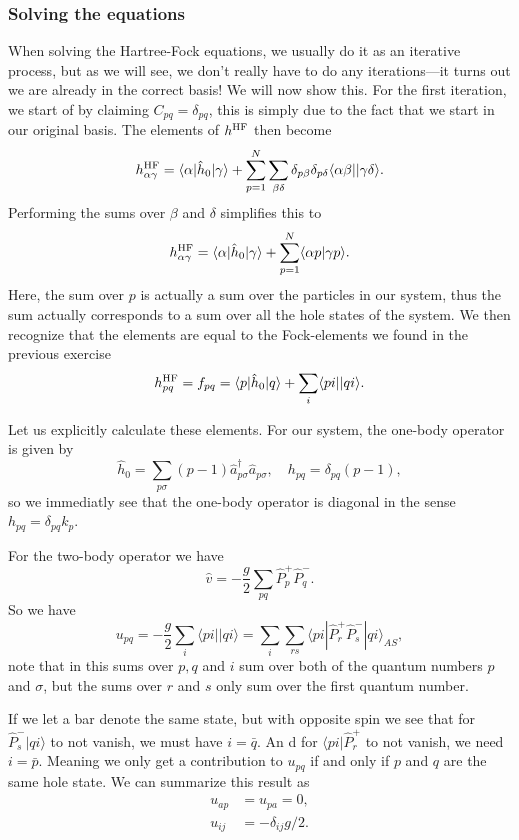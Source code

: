 \documentclass[a4paper, 11pt, notitlepage, english]{article}
\newcommand{\bra}[1]{\langle #1|}
\newcommand{\ket}[1]{|#1 \rangle}
\newcommand{\braket}[2]{\langle #1 | #2 \rangle}
\newcommand{\brakket}[2]{\langle #1 || #2 \rangle}
\newcommand{\op}[1]{\hat{#1}}
\newcommand{\braopket}[3]{\langle #1 | {#2} | #3 \rangle}
\begin{document}
\subsubsection*{Solving the equations}

When solving the Hartree-Fock equations, we usually do it as an iterative process, but as we will see, we don't really have to do any iterations---it turns out we are already in the correct basis! We will now show this. For the first iteration, we start of by claiming $C_{pq} = \delta_{pq}$, this is simply due to the fact that we start in our original basis. 
The elements of $h^{\rm HF}$ then become
$$h^{\rm HF}_{\alpha\gamma} = \braopket{\alpha}{\op{h}_0}{\gamma} + \sum_{p=1}^N\sum_{\beta\delta} \delta_{p\beta} \delta_{p \delta} \braket{\alpha\beta|}{\gamma\delta}.$$
Performing the sums over $\beta$ and $\delta$ simplifies this to
$$h^{\rm HF}_{\alpha\gamma} = \braopket{\alpha}{\op{h}_0}{\gamma} + \sum_{p=1}^N \braket{\alpha p}{\gamma p}.$$
Here, the sum over $p$ is actually a sum over the particles in our system, thus the sum actually corresponds to a sum over all the hole states of the system. We then recognize that the elements are equal to the Fock-elements we found in the previous exercise
$$h^{\rm HF}_{pq} = f_{pq} = \braopket{p}{\op{h}_0}{q} + \sum_{i} \brakket{pi}{qi}.$$

Let us explicitly calculate these elements. For our system, the one-body operator is given by
$$\op{h}_0 = \sum_{p\sigma} (p-1)\op{a}_{p\sigma}^\dagger \op{a}_{p\sigma}, \quad h_{pq} = \delta_{pq} (p-1),$$
so we immediatly see that the one-body operator is diagonal in the sense $h_{pq} = \delta_{pq} k_p$.

For the two-body operator we have 
$$\op{v} = -\frac{g}{2}\sum_{pq}\op{P}_{p}^+ \op{P}_{q}^-.$$
So we have
$$u_{pq} = -\frac{g}{2} \sum_{i} \brakket{pi}{qi} = \sum_i\sum_{rs} \braopket{pi}{\op{P}_{r}^+ \op{P}_{s}^-}{qi}_{AS},$$
note that in this sums over $p, q$ and $i$ sum over both of the quantum numbers $p$ and $\sigma$, but the sums over $r$ and $s$ only sum over the first quantum number.

If we let a bar denote the same state, but with opposite spin we see that for $\op{P}^-_s\ket{q i}$ to 
not vanish, we must have $i=\bar{q}$. An
d for $\bra{pi}\op{P}^+_r$ to not vanish, we
 need $i=\bar{p}$. Meaning we only get a contribution to $u_{pq}$ if and only if $p$ and $q$ are the same hole state. We can summarize this result as
\begin{align*}
u_{ap} &= u_{pa} = 0, \\
u_{ij} &= -\delta_{ij} g/2.
\end{align*}
\end{document}
